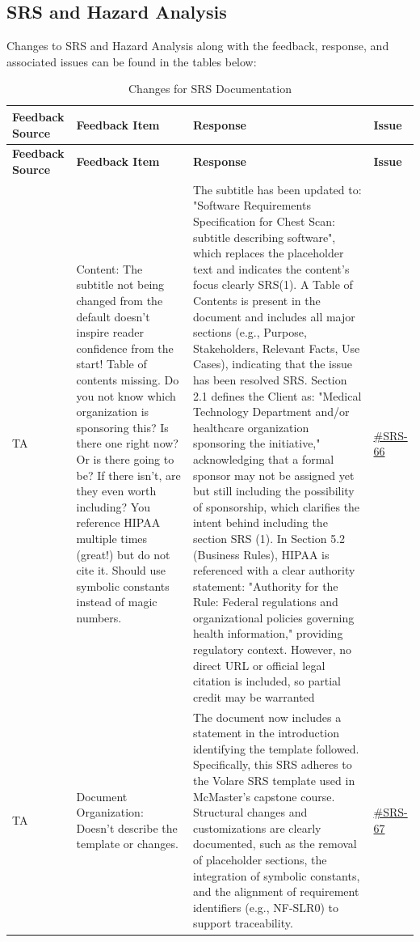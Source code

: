 \documentclass{article}
\begin{document}
\subsection{SRS and Hazard Analysis}
Changes to SRS and Hazard Analysis along with the feedback, response, and associated issues can
be found in the tables below:
\renewcommand{\arraystretch}{1.3}
\begin{longtable}{|p{1.48cm}|p{5cm}|p{4.7cm}|p{1cm}|}
\caption{Changes for SRS Documentation} \\
\hline
\textbf{Feedback Source} & \textbf{Feedback Item} & \textbf{Response} & \textbf{Issue} \\
\hline
\endfirsthead

\hline
\textbf{Feedback Source} & \textbf{Feedback Item} & \textbf{Response} & \textbf{Issue} \\
\hline
\endhead

TA & Content: The subtitle not being changed from the default doesn't inspire reader confidence from the start! Table of contents missing. Do you not know which organization is sponsoring this? Is there one right now? Or is there going to be? If there isn't, are they even worth including? You reference HIPAA multiple times (great!) but do not cite it. Should use symbolic constants instead of magic numbers. & The subtitle has been updated to:
"Software Requirements Specification for Chest Scan: subtitle describing software", which replaces the placeholder text and indicates the content's focus clearly SRS(1). A Table of Contents is present in the document and includes all major sections (e.g., Purpose, Stakeholders, Relevant Facts, Use Cases), indicating that the issue has been resolved SRS. Section 2.1 defines the Client as:
"Medical Technology Department and/or healthcare organization sponsoring the initiative,"
acknowledging that a formal sponsor may not be assigned yet but still including the possibility of sponsorship, which clarifies the intent behind including the section SRS (1). In Section 5.2 (Business Rules), HIPAA is referenced with a clear authority statement:
"Authority for the Rule: Federal regulations and organizational policies governing health information,"
providing regulatory context. However, no direct URL or official legal citation is included, so partial credit may be warranted
 & \href{https://github.com/harrisonchiu/xray/issues/66}{\#SRS-66} \\
\hline

TA & Document Organization: Doesn't describe the template or changes. & The document now includes a statement in the introduction identifying the template followed. Specifically, this SRS adheres to the Volare SRS template used in McMaster's capstone course. Structural changes and customizations are clearly documented, such as the removal of placeholder sections, the integration of symbolic constants, and the alignment of requirement identifiers (e.g., NF-SLR0) to support traceability.  & \href{https://github.com/harrisonchiu/xray/issues/67}{\#SRS-67} \\
\hline


\end{longtable}
\end{document}
